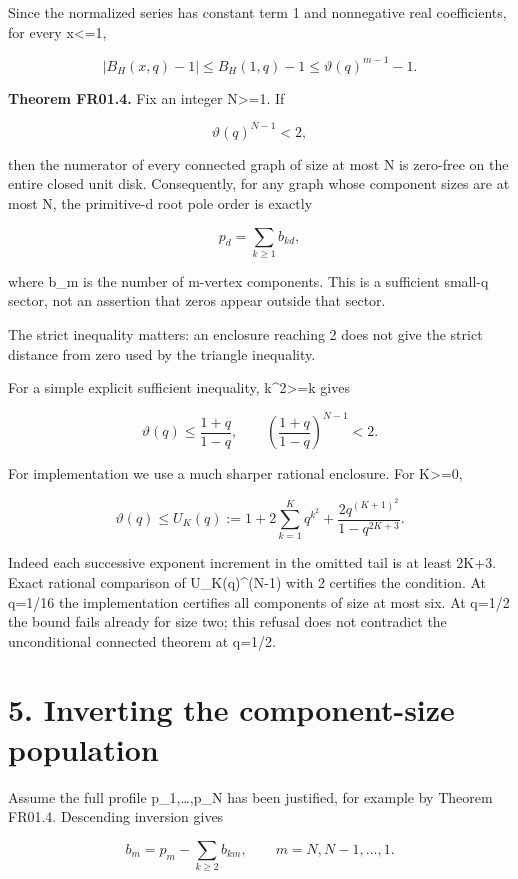 \documentclass[
  11pt,
  a4paper,
]{report}
\begin{document}
Since the normalized series has constant term 1 and nonnegative real
coefficients, for every \textbar x\textbar\textless=1,

\[
 |B_H(x,q)-1|\le B_H(1,q)-1
                   \le\vartheta(q)^{m-1}-1.
\]

\textbf{Theorem FR01.4.} Fix an integer N\textgreater=1. If

\[
 \boxed{\vartheta(q)^{N-1}<2,}
\]

then the numerator of every connected graph of size at most N is
zero-free on the entire closed unit disk. Consequently, for any graph
whose component sizes are at most N, the primitive-d root pole order is
exactly

\[
 p_d=\sum_{k\ge1}b_{kd},
\]

where b\_m is the number of m-vertex components. This is a sufficient
small-q sector, not an assertion that zeros appear outside that sector.

The strict inequality matters: an enclosure reaching 2 does not give the
strict distance from zero used by the triangle inequality.

For a simple explicit sufficient inequality, k\^{}2\textgreater=k gives

\[
 \vartheta(q)\le\frac{1+q}{1-q},\qquad
 \left(\frac{1+q}{1-q}\right)^{N-1}<2.
\]

For implementation we use a much sharper rational enclosure. For
K\textgreater=0,

\[
 \vartheta(q)\le U_K(q):=
 1+2\sum_{k=1}^Kq^{k^2}
 +\frac{2q^{(K+1)^2}}{1-q^{2K+3}}.
\]

Indeed each successive exponent increment in the omitted tail is at
least 2K+3. Exact rational comparison of U\_K(q)\^{}(N-1) with 2
certifies the condition. At q=1/16 the implementation certifies all
components of size at most six. At q=1/2 the bound fails already for
size two; this refusal does not contradict the unconditional connected
theorem at q=1/2.

\hypertarget{inverting-the-component-size-population}{%
\section{5. Inverting the component-size
population}\label{inverting-the-component-size-population}}

Assume the full profile p\_1,\ldots,p\_N has been justified, for example
by Theorem FR01.4. Descending inversion gives

\[
 \boxed{b_m=p_m-\sum_{k\ge2}b_{km},\qquad m=N,N-1,\ldots,1.}
\]
\end{document}
